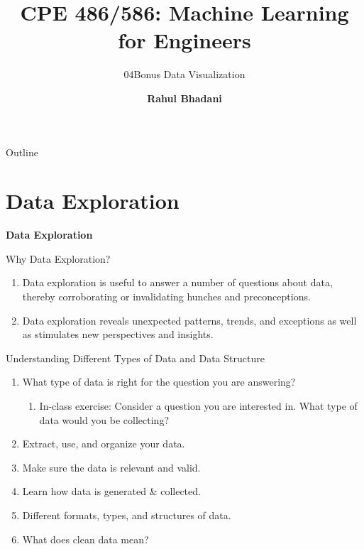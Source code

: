 \documentclass[aspectratio=169,xcolor=dvipsnames,svgnames,x11names,fleqn]{beamer}
\title[CPE 486/586: Machine Learning]{CPE 486/586: Machine Learning for Engineers} %
\subtitle{04Bonus Data Visualization}
\author[Rahul Bhadani] {{\Large \textbf{Rahul Bhadani}}}
\institute[UAH] %
{
    Electrical \& Computer Engineering,  The University of Alabama in Huntsville
}
\date
\begin{document}
\begin{frame}
    \titlepage
\end{frame}

\begin{frame}{Outline}
    \backgroundtableofcontents
\end{frame}


\section{Data Exploration}

\begin{frame}{}
\begin{center}
    \huge \bf \color{DarkRed}
    Data Exploration
\end{center}
\end{frame}

\begin{frame}{Why Data Exploration?}
    \begin{facts}{}
        \begin{enumerate}
            \item Data exploration is useful to answer a number of questions about data, thereby corroborating or invalidating hunches and preconceptions.
            \item Data exploration reveals unexpected patterns, trends, and exceptions as well as stimulates new perspectives and insights.
        \end{enumerate}
    \end{facts}
\end{frame}

\begin{frame}{Understanding Different Types of Data and Data Structure}
    \begin{gradbox}{}
        \begin{enumerate}
            \item What type of data is right for the question you are answering?
                \begin{enumerate}
                    \item In-class exercise: Consider a question you are interested in. What type of data would you be collecting?  
                \end{enumerate}
            \item Extract, use, and organize your data.
            \item Make sure the data is relevant and valid.
            \item Learn how data is generated \& collected.
            \item Different formats, types, and structures of data.
            \item What does clean data mean?
        \end{enumerate}
    \end{gradbox}
\end{frame}
\end{document}
